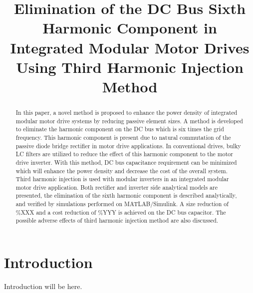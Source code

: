 \documentclass[conference,a4paper,twocolumn]{IEEEtran}
\begin{document}
\title{Elimination of the DC Bus Sixth Harmonic Component in Integrated Modular Motor Drives Using Third Harmonic Injection Method}
\author{
\and
{}
}
\maketitle
\begin{abstract}
In this paper, a novel method is proposed to enhance the power density of integrated modular motor drive systems by reducing passive element sizes. A method is developed to eliminate the harmonic component on the DC bus which is six times the grid frequency. This harmonic component is present due to natural commutation of the passive diode bridge rectifier in motor drive applications. In conventional drives, bulky LC filters are utilized to reduce the effect of this harmonic component to the motor drive inverter. With this method, DC bus capacitance requirement can be minimized which will enhance the power density and decrease the cost of the overall system. Third harmonic injection is used with modular inverters in an integrated modular motor drive application. Both rectifier and inverter side analytical models are presented, the elimination of the sixth harmonic component is described analytically, and verified by simulations performed on MATLAB/Simulink. A size reduction of \%XXX and a cost reduction of \%YYY is achieved on the DC bus capacitor. The possible adverse effects of third harmonic injection method are also discussed.
\end{abstract}
\IEEEpeerreviewmaketitle

\section{Introduction}

Introduction will be here.
\end{document}
